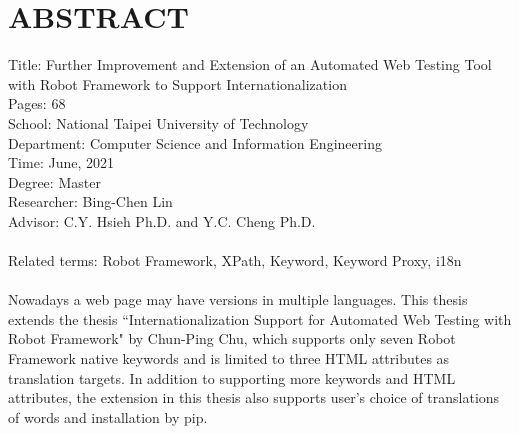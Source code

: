 \chapter*{ABSTRACT}


\noindent
Title: Further Improvement and Extension of an Automated Web Testing Tool 
with Robot Framework to Support Internationalization\\
Pages: 68\\
School: National Taipei University of Technology\\
Department: Computer Science and Information Engineering\\
Time: June, 2021\\
Degree: Master\\
Researcher: Bing-Chen Lin\\
Advisor: C.Y. Hsieh Ph.D. and Y.C. Cheng Ph.D.\\
\hspace*{\fill}\\
Related terms: Robot Framework, XPath, Keyword, Keyword Proxy, i18n\\
\hspace*{\fill}\\
%
\indent
Nowadays a web page may have versions in multiple languages. This thesis extends the thesis “Internationalization Support for Automated Web Testing with Robot Framework" by Chun-Ping Chu, which supports only seven Robot Framework native keywords and is limited to three HTML attributes as translation targets. In addition to supporting more keywords and HTML attributes, the extension in this thesis also supports user’s choice of translations of words and  installation by pip.
